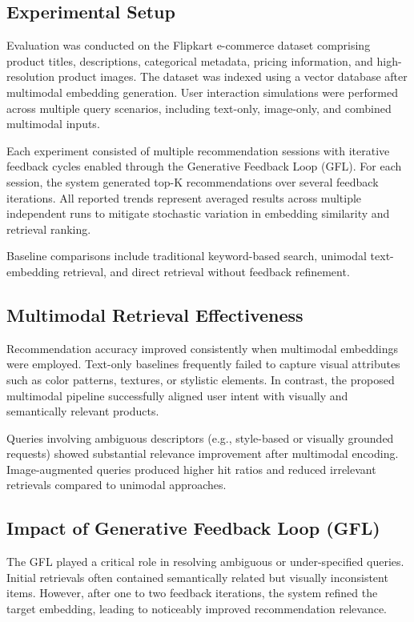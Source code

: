 \documentclass[conference]{IEEEtran}
\begin{document}
\subsection{Experimental Setup}

Evaluation was conducted on the Flipkart e-commerce dataset comprising product titles, descriptions, categorical metadata, pricing information, and high-resolution product images. The dataset was indexed using a vector database after multimodal embedding generation. User interaction simulations were performed across multiple query scenarios, including text-only, image-only, and combined multimodal inputs.

Each experiment consisted of multiple recommendation sessions with iterative feedback cycles enabled through the Generative Feedback Loop (GFL). For each session, the system generated top-K recommendations over several feedback iterations. All reported trends represent averaged results across multiple independent runs to mitigate stochastic variation in embedding similarity and retrieval ranking.

Baseline comparisons include traditional keyword-based search, unimodal text-embedding retrieval, and direct retrieval without feedback refinement.

\subsection{Multimodal Retrieval Effectiveness}

Recommendation accuracy improved consistently when multimodal embeddings were employed. Text-only baselines frequently failed to capture visual attributes such as color patterns, textures, or stylistic elements. In contrast, the proposed multimodal pipeline successfully aligned user intent with visually and semantically relevant products.

Queries involving ambiguous descriptors (e.g., style-based or visually grounded requests) showed substantial relevance improvement after multimodal encoding. Image-augmented queries produced higher hit ratios and reduced irrelevant retrievals compared to unimodal approaches.

\subsection{Impact of Generative Feedback Loop (GFL)}

The GFL played a critical role in resolving ambiguous or under-specified queries. Initial retrievals often contained semantically related but visually inconsistent items. However, after one to two feedback iterations, the system refined the target embedding, leading to noticeably improved recommendation relevance.
\end{document}
